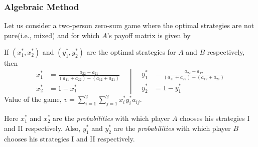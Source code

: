 \documentclass[../main-sheet.tex]{subfiles}
\begin{document}
\subsubsection{Algebraic Method}
Let us consider a two-person zero-sum game where the optimal strategies are not pure(i.e., mixed) and for which \(A\)'s payoff matrix is given by
\begin{center}
    \end{center}
    If \(\left(x_1^{*},x_2^{*}\right)\) and \(\left(y_1^{*},y_2^{*}\right)\) are the optimal strategies for \(A\) and \(B\) respectively, then
    \[
        \left.\begin{aligned}
        x_1^{*}&=\frac{a_{22}-a_{21}}{(a_{11}+a_{22})-(a_{12}+a_{21})}\\
        x_2^{*}&=1-x_1^{*}
    \end{aligned}\quad\right\vert\quad
        \begin{aligned}
        y_1^{*}&=\frac{a_{22}-a_{12}}{(a_{11}+a_{22})-(a_{12}+a_{21})}\\
        y_2^{*}&=1-y_1^{*}
    \end{aligned}
    \]
    Value of the game, \(\displaystyle v=\sum_{i=1}^2\sum_{j=1}^2 x_i^{*}y_i^{*}a_{ij}\).
    \begin{rem}
        Here \(x_1^{*}\) and \(x_2^{*}\) are the \emph{probabilities} with which player \(A\) chooses his strategies I and II respectively. Also, \(y_1^{*}\) and \(y_2^{*}\) are the \emph{probabilities} with which player \(B\) chooses his strategies I and II respectively.
    \end{rem}
\end{document}

